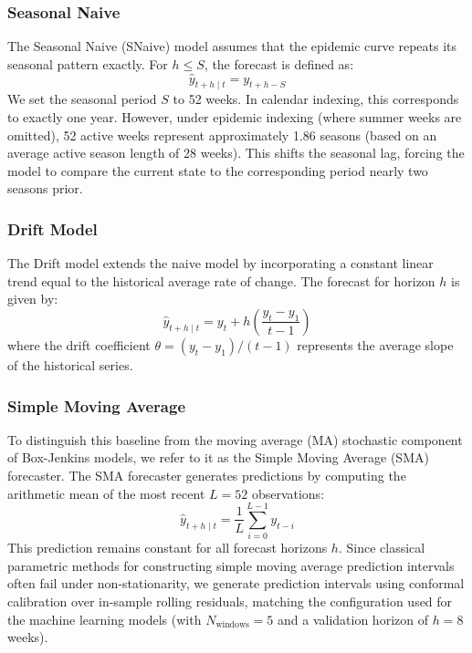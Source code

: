 \subsubsection{Seasonal Naive}
The Seasonal Naive (SNaive) model assumes that the epidemic curve repeats its seasonal pattern exactly. For $h \le S$, the forecast is defined as:
\begin{equation}
\hat{y}_{t+h\mid t} = y_{t+h-S}
\end{equation}
We set the seasonal period $S$ to 52 weeks. In calendar indexing, this corresponds to exactly one year. However, under epidemic indexing (where summer weeks are omitted), 52 active weeks represent approximately 1.86 seasons (based on an average active season length of 28 weeks). This shifts the seasonal lag, forcing the model to compare the current state to the corresponding period nearly two seasons prior.

\subsubsection{Drift Model}
The Drift model extends the naive model by incorporating a constant linear trend equal to the historical average rate of change. The forecast for horizon $h$ is given by:
\begin{equation}
\hat{y}_{t+h\mid t} = y_t + h \left( \frac{y_t - y_1}{t-1} \right)
\end{equation}
where the drift coefficient $\theta = (y_t - y_1)/(t-1)$ represents the average slope of the historical series.

\subsubsection{Simple Moving Average}
To distinguish this baseline from the moving average (MA) stochastic component of Box-Jenkins models, we refer to it as the Simple Moving Average (SMA) forecaster. The SMA forecaster generates predictions by computing the arithmetic mean of the most recent $L = 52$ observations:
\begin{equation}
\hat{y}_{t+h\mid t} = \frac{1}{L}\sum_{i=0}^{L-1} y_{t-i}
\end{equation}
This prediction remains constant for all forecast horizons $h$. Since classical parametric methods for constructing simple moving average prediction intervals often fail under non-stationarity, we generate prediction intervals using conformal calibration over in-sample rolling residuals, matching the configuration used for the machine learning models (with $N_{\text{windows}}=5$ and a validation horizon of $h=8$ weeks).

